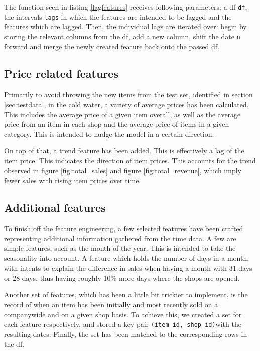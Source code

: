 

The function seen in listing \ref{lagfeatures} receives following parameters: a \gls{df} \texttt{df}, the intervals \texttt{lags} in which the features are intended to be lagged and the features which are lagged. Then, the individual lags are iterated over: begin by storing the relevant columns from the \gls{df}, add a new column, shift the date \texttt{n} forward and merge the newly created feature back onto the passed \gls{df}.


\subsection{Price related features}

Primarily to avoid throwing the new items from the test set, identified in section \ref{sec:testdata}, in the cold water, a variety of average prices has been calculated. This includes the average price of a given item overall, as well as the average price from an item in each shop and the average price of items in a given category.
This is intended to nudge the model in a certain direction.

On top of that, a trend feature has been added. This is effectively a lag of the item price. 
This indicates the direction of item prices. This accounts for the trend observed in figure \ref{fig:total_sales} and figure \ref{fig:total_revenue}, which imply fewer sales with rising item prices over time.

\subsection{Additional features}

To finish off the feature engineering, a few selected features have been crafted representing additional information gathered from the time data. A few are simple features, such as the month of the year. This is intended to take the seasonality into account. A feature which holds the number of days in a month, with intents to explain the difference in sales when having a month with 31 days or 28 days, thus having roughly 10\% more days where the shops are opened.

Another set of features, which has been a little bit trickier to implement, is the record of when an item has been initially and most recently sold on a companywide and on a given shop basis.
To achieve this, we created a set for each feature respectively, and stored a key pair \texttt{(item\_id, shop\_id)}with the resulting dates. Finally, the set has been matched to the corresponding rows in the \gls{df}.
